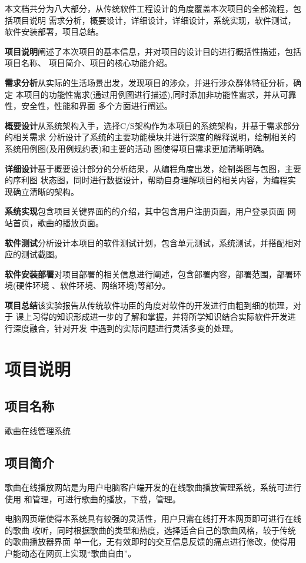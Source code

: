 \documentclass[UTF8,14pt]{article}
\numberwithin{figure}{subsubsection}
\numberwithin{table}{subsubsection}
\begin{document}
本文档共分为八大部分，从传统软件工程设计的角度覆盖本次项目的全部流程，包括项目说明
需求分析，概要设计，详细设计，详细设计，系统实现，软件测试，软件安装部署，项目总结。

{\bfseries{项目说明}}阐述了本次项目的基本信息，并对项目的设计目的进行概括性描述，包括项目名称、
项目简介、项目的核心功能介绍。

{\bfseries{需求分析}}从实际的生活场景出发，发现项目的涉众，并进行涉众群体特征分析，确定
本项目的功能性需求(通过用例图进行描述),同时添加非功能性需求，并从可靠性，安全性，性能和界面
多个方面进行阐述。

{\bfseries{概要设计}}从系统架构入手，选择C/S架构作为本项目的系统架构，并基于需求部分的相关需求
分析设计了系统的主要功能模块并进行深度的解释说明，绘制相关的系统用例图(及用例规约表)和主要的活动
图使得项目需求更加清晰明确。

{\bfseries{详细设计}}基于概要设计部分的分析结果，从编程角度出发，绘制类图与包图，主要的序利图
状态图，同时进行数据设计，帮助自身理解项目的相关内容，为编程实现确立清晰的架构。

{\bfseries{系统实现}}包含项目关键界面的的介绍，其中包含用户注册页面，用户登录页面
网站首页，歌曲的播放页面。

{\bfseries{软件测试}}分析设计本项目的软件测试计划，包含单元测试，系统测试，并搭配相对应的测试截图。

{\bfseries{软件安装部署}}对项目部署的相关信息进行阐述，包含部署内容，部署范围，部署环境(硬件环境
、软件环境、网络环境)等部分。

{\bfseries{项目总结}}该实验报告从传统软件功臣的角度对软件的开发进行由粗到细的梳理，对于
课上习得的知识形成进一步的了解和掌握，并将所学知识结合实际软件开发进行深度融合，针对开发
中遇到的实际问题进行灵活多变的处理。

\tableofcontents
\clearpage


\section{项目说明}
\subsection{项目名称}
歌曲在线管理系统
\subsection{项目简介}
歌曲在线播放网站是为用户电脑客户端开发的在线歌曲播放管理系统，系统可进行使用
和管理，可进行歌曲的播放，下载，管理。

电脑网页端使得本系统具有较强的灵活性，用户只需在线打开本网页即可进行在线的歌曲
收听，同时根据歌曲的类型和热度，选择适合自己的歌曲风格，较于传统的歌曲播放器界面
单一化，无有效即时的交互信息反馈的痛点进行修改，使得用户能动态在网页上实现“歌曲自由”。
\end{document}

